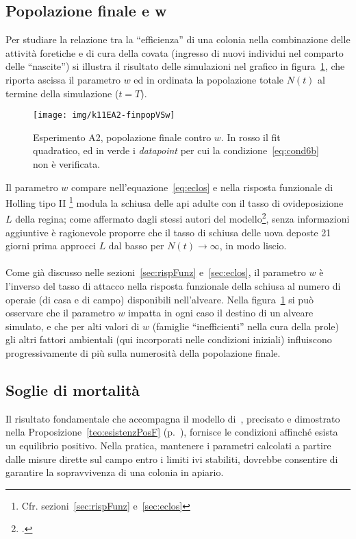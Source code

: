 \subsection{Popolazione finale e w}
Per studiare la relazione tra la ``efficienza'' di una colonia nella combinazione delle attività foretiche e di
cura della covata (ingresso di nuovi individui nel comparto delle ``nascite'') si illustra il risultato delle
simulazioni nel grafico in figura~\ref{img:kh11expA23}, che riporta ascissa il parametro $w$ ed in ordinata
la popolazione totale $N(t)$ al termine della simulazione ($t=T$).
\begin{figure}[hbt]
    \centering
    \texttt{[image: img/k11EA2-finpopVSw]}

    \caption[Esperimento A2, popolazione finale contro w.]{Esperimento A2, popolazione finale contro $w$.
    In rosso il fit quadratico, ed in verde i \emph{datapoint} per cui la condizione~\eqref{eq:cond6b} non
    è verificata.}
    \label{img:kh11expA23}
\end{figure}

Il parametro $w$ compare nell'equazione~\eqref{eq:eclos} e nella risposta funzionale di Holling tipo II
\footnote{Cfr. sezioni~\ref{sec:rispFunz} e~\ref{sec:eclos}}
modula la schiusa delle api adulte con il tasso di ovideposizione $L$ della regina; come
affermato dagli stessi autori del modello\footcite[2]{khoury2011}, senza informazioni aggiuntive è ragionevole
proporre che il tasso di schiusa delle uova deposte 21 giorni prima approcci $L$ dal basso per $N(t) \to \infty$,
in modo liscio.

\paragraph{}
Come già discusso nelle sezioni~\ref{sec:rispFunz} e~\ref{sec:eclos}, il parametro $w$ è l'inverso del tasso di
attacco nella risposta funzionale della schiusa al numero di operaie (di casa e di campo) disponibili nell'alveare.
Nella figura~\ref{img:kh11expA23} si può osservare che il parametro $w$ impatta in ogni caso il destino di un
alveare simulato, e che per alti valori di $w$ (\ie famiglie ``inefficienti'' nella cura della prole) gli altri
fattori ambientali (qui incorporati nelle condizioni iniziali) influiscono progressivamente di più sulla
numerosità della popolazione finale.

\subsection{Soglie di mortalità}
Il risultato fondamentale che accompagna il modello di~\citeauthor{khoury2011}, precisato e dimostrato nella
Proposizione~\ref{teo:esistenzPosF} (p.~\pageref{teo:esistenzPosF}), fornisce le condizioni affinché esista un
equilibrio positivo. Nella pratica, mantenere i parametri calcolati a partire dalle misure dirette sul campo
entro i limiti ivi stabiliti, dovrebbe consentire di garantire la sopravvivenza di una colonia in apiario.

